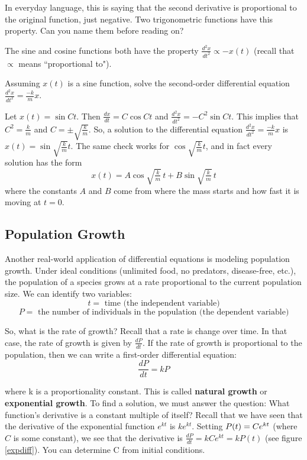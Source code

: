 In everyday language, this is saying that the second derivative is proportional 
to the original function, just negative. Two trigonometric functions have this property. Can you
name them before reading on? 

The sine and cosine functions both have the property $\frac{d^2x}{dt^2} \propto 
-x(t)$ (recall that $\propto$ means ``proportional to"). 

\begin{Worked}
\begin{Problem}
Assuming $x(t)$ is a sine function, solve the second-order
differential equation $\frac{d^2x}{dt^2} = \frac{-k}{m}x$.
\end{Problem}
\begin{Solution}
Let $x(t) = \sin{Ct}$. Then $\frac{dx}{dt} = C\cos{Ct}$ and
$\frac{d^2x}{dt^2} = -C^2\sin{Ct}$. This implies that $C^2 = \frac{k}{m}$ and 
$C = \pm \sqrt{\frac{k}{m}}$. So, a solution to the differential equation 
$\frac{d^2x}{dt^2} = \frac{-k}{m}x$ is $x(t) = \sin{\sqrt{\frac{k}{m}}t}$.
The same check works for $\cos{\sqrt{\frac{k}{m}}t}$, and in fact every
solution has the form
$$x(t) = A\cos{\sqrt{\tfrac{k}{m}}\,t} + B\sin{\sqrt{\tfrac{k}{m}}\,t}$$
where the constants $A$ and $B$ come from where the mass starts and how fast it
is moving at $t = 0$. 
\end{Solution}
\end{Worked}

\subsection{Population Growth}
Another real-world application of differential equations is modeling population 
growth. Under ideal conditions (unlimited food, no predators, disease-free, 
etc.), the population of a species grows at a rate proportional to the current 
population size. We can identify two variables:
$$t = \text{ time (the independent variable)}$$
$$P = \text{ the number of individuals in the population (the dependent 
variable)}$$

So, what is the rate of growth? Recall that a rate is change over time. In 
that case, the rate of growth is given by $\frac{dP}{dt}$. If the rate of 
growth is proportional to the population, then we can write a first-order 
differential equation:
$$\frac{dP}{dt} = kP$$

where k is a proportionality constant. This is called \textbf{natural growth} 
or \textbf{exponential growth}. 
To find a solution, we must answer the question: What function's derivative is 
a constant multiple of itself? Recall that we have seen that the derivative of 
the exponential function $e^{kt}$ is $ke^{kt}$. Setting $P(t) = \index{exponential growth}Ce^{kt}$ 
(where $C$ is some constant), we see that the derivative is $\frac{dP}{dt} = 
kCe^{kt} = kP(t)$ (see figure \ref{expdiff}). You can determine C from initial 
conditions. 

